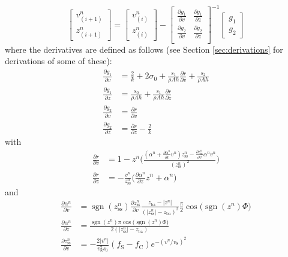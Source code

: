 \documentclass{article}
\DeclareMathOperator{\sgn}{sgn}
\begin{document}
\begin{equation}
    \begin{bmatrix}
    v_{(i+1)}^n\\
    z_{(i+1)}^n
    \end{bmatrix}
    =
    \begin{bmatrix}
    v_{(i)}^n\\
    z_{(i)}^n
    \end{bmatrix}
    -
    \begin{bmatrix}
    \frac{\partial g_1}{\partial v} & \frac{\partial g_1}{\partial z}\\
    \frac{\partial g_2}{\partial v} & \frac{\partial g_2}{\partial z}\\
    \end{bmatrix}^{-1}
    \begin{bmatrix}
    g_1\\
    g_2
    \end{bmatrix}
\end{equation}
where the derivatives are defined as follows (see Section \ref{sec:derivations} for derivations of some of these): 
\begin{align}
    \frac{\partial g_1}{\partial v} &= \frac{2}{k} + 2\sigma_0 + \frac{s_1}{\rho Ah}\frac{\partial r}{\partial v}+\frac{s_2}{\rho Ah}\\
    \frac{\partial g_1}{\partial z} &= \frac{s_0}{\rho A h} + \frac{s_1}{\rho Ah}\frac{\partial r}{\partial z}\\
    \frac{\partial g_2}{\partial v} &= \frac{\partial r}{\partial v}
    \\\frac{\partial g_2}{\partial z}&= \frac{\partial r}{\partial z} -\frac{2}{k}
\end{align}
with
\begin{align}
    \frac{\partial r}{\partial v} &= 1-z^n\Bigg(\frac{(\alpha^n+\frac{\partial \alpha^n}{\partial v}v^n)z_\text{ss}^n - \frac{\partial z_\text{ss}^n}{\partial v}\alpha^n v^n}{(z_\text{ss}^n)^2}\Bigg)\label{eq:g2v}\\
    \frac{\partial r}{\partial z} &= -\frac{v^n}{z_\text{ss}^n}\bigg(\frac{\partial \alpha^n}{\partial z}z^n + \alpha^n\bigg)
    \end{align}
    and
    \begin{align}
    \frac{\partial\alpha^n}{\partial v} &=\sgn(z_\text{ss}^n)\frac{\partial z_\text{ss}^n}{\partial v}\frac{z_\text{ba} - |z^n|}{(|z_\text{ss}^n| - z_\text{ba})^2}\frac{\pi}{2}\cos\big(\sgn(z^n)\Phi\big)\\
    \frac{\partial\alpha^n}{\partial z}&=\frac{\sgn(z^n)\pi\cos\big(\sgn(z^n)\Phi\big)}{2(|z_\text{ss}^n|-z_\text{ba})}\\
    \frac{\partial z_\text{ss}^n}{\partial v} &= -\frac{2|v^n|}{v_\text{S}^2 s_0}(f_\text{S}-f_\text{C})e^{-(v^n/v_\text{S})^2}
\end{align}
\end{document}
